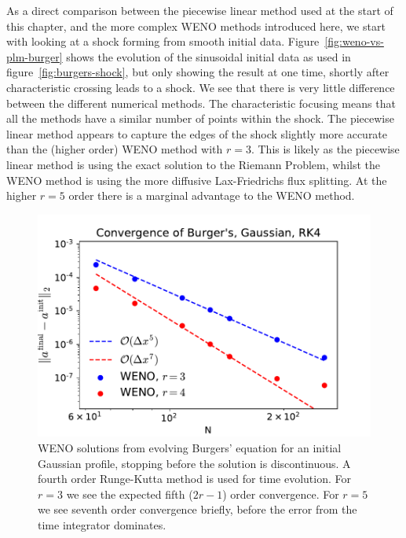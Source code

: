 As a direct comparison between the piecewise linear method used at the start of
this chapter, and the more complex WENO methods introduced here, we start with
looking at a shock forming from smooth initial data. Figure~\ref{fig:weno-vs-plm-burger}
shows the evolution of the sinusoidal initial data as used in figure~\ref{fig:burgers-shock},
but only showing the result at one time, shortly after characteristic crossing
leads to a shock. We see that there is very little difference between the
different numerical methods. The characteristic focusing means that all the
methods have a similar number of points within the shock. The piecewise linear
method appears to capture the edges of the shock slightly more accurate than the
(higher order) WENO method with $r=3$. This is likely as the piecewise linear
method is using the exact solution to the Riemann Problem, whilst the WENO method
is using the more diffusive Lax-Friedrichs flux splitting. At the higher $r=5$
order there is a marginal advantage to the WENO method.

\begin{figure}[t]
\centering
\includegraphics[width=0.8\linewidth]{weno-converge-burgers}
\caption[WENO convergence rates for Burgers' equation]
{\label{fig:weno-converge-burgers} WENO solutions from evolving Burgers'
equation for an initial Gaussian profile, stopping before the solution is
discontinuous. A fourth order Runge-Kutta method is used for time evolution.
For $r=3$ we see the expected fifth ($2 r - 1$) order convergence.
For $r=5$ we see seventh order convergence briefly, before the error from the
time integrator dominates. \\
}
\end{figure}
%

